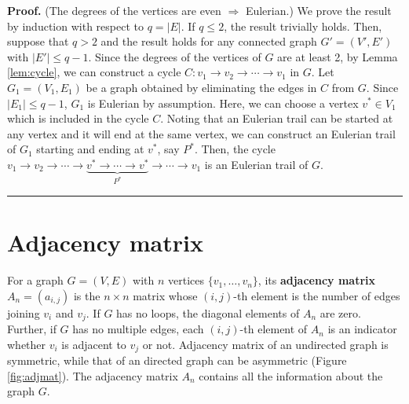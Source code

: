 \documentclass[10.5pt, A4paper, openany, uplatex]{book}
\newenvironment{proof}[1][Proof]{\textbf{#1.} }{\  \rule{0.5em}{0.5em}}
\numberwithin{equation}{section}
\begin{document}
\begin{appendices}
\begin{proof}
		(The degrees of the vertices are even $\Rightarrow$ Eulerian.) We prove the result by induction with respect to $q = |E|$.
		If $q \le 2$, the result trivially holds.
		Then, suppose that $q > 2$ and the result holds for any connected graph $G' = (V', E')$ with $|E'| \le q - 1$.
		Since the degrees of the vertices of $G$ are at least 2, by Lemma \ref{lem:cycle}, we can construct a cycle $C: v_1 \to v_2 \to \cdots \to v_1$ in $G$.
		Let $G_1 = (V_1, E_1)$ be a graph obtained by eliminating the edges in $C$ from $G$.
		Since $|E_1| \le q - 1$, $G_1$ is Eulerian by assumption.
		Here, we can choose a vertex $v^* \in V_1$ which is included in the cycle $C$. 
		Noting that an Eulerian trail can be started at any vertex and it will end at the same vertex, we can construct an Eulerian trail of $G_1$ starting and ending at $v^*$, say $P^*$.
		Then, the cycle $v_1 \to v_2 \to \cdots \to \underbrace{v^* \to \cdots \to v^*}_{P^*} \to \cdots \to v_1$ is an Eulerian trail of $G$.
	\end{proof}
	\section{Adjacency matrix}\label{sec:adjacency}
	
	For a graph $G = (V, E)$ with $n$ vertices $\{v_1, \ldots, v_n\}$, its \textbf{adjacency matrix} $A_n = (a_{i,j})$ is the $n \times n$ matrix whose $(i,j)$-th element is the number of edges joining $v_i$ and $v_j$.
	If $G$ has no loops, the diagonal elements of $A_n$ are zero.
	Further, if $G$ has no multiple edges, each $(i,j)$-th element of $A_n$ is an indicator whether $v_i$ is adjacent to $v_j$ or not.
	Adjacency matrix of an undirected graph is symmetric, while that of an directed graph can be asymmetric (Figure \ref{fig:adjmat}).
	The adjacency matrix $A_n$ contains all the information about the graph $G$.
	

\end{appendices}
\end{document}
